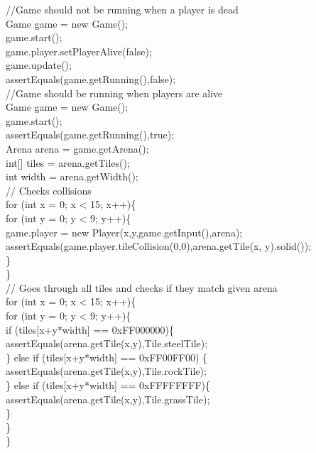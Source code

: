 \documentclass[12pt, letterpaper]{article}
\begin{document}
//Game should not be running when a player is dead\\
\indent Game game = new Game();\\
\indent game.start();\\
\indent game.player.setPlayerAlive(false);\\
\indent game.update();\\
\indent assertEquals(game.getRunning(),false);\\

//Game should be running when players are alive\\
\indent Game game = new Game();\\
\indent game.start();\\
\indent assertEquals(game.getRunning(),true);\\

Arena arena = game.getArena();\\
\indent int[] tiles = arena.getTiles();\\
\indent int width = arena.getWidth();\\

// Checks collisions\\
\indent for (int x = 0; x < 15; x++)\{\\
\indent \indent for (int y = 0; y < 9; y++)\{\\
\indent \indent \indent game.player = new Player(x,y,game.getInput(),arena);\\
\indent \indent \indent assertEquals(game.player.tileCollision(0,0),arena.getTile(x, y).solid());\\
\indent \indent \}\\
\indent \}\\

// Goes through all tiles and checks if they match given arena\\
\indent for (int x = 0; x < 15; x++)\{\\
\indent \indent for (int y = 0; y < 9; y++)\{\\
\indent \indent \indent if (tiles[x+y*width] ==  0xFF000000)\{\\
\indent \indent \indent \indent assertEquals(arena.getTile(x,y),Tile.steelTile);\\
\indent \indent \indent \} else if (tiles[x+y*width] ==  0xFF00FF00) \{\\
\indent \indent \indent \indent assertEquals(arena.getTile(x,y),Tile.rockTile);\\
\indent \indent \indent \} else if (tiles[x+y*width] ==  0xFFFFFFFF)\{\\
\indent \indent \indent \indent assertEquals(arena.getTile(x,y),Tile.grassTile);\\
\indent \indent \indent \}\\
\indent \indent \}\\
\indent \}\\
\end{document}
